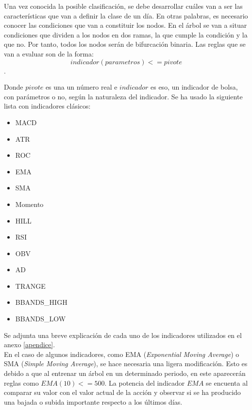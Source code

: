 Una vez conocida la posible clasificaci\'on, se debe desarrollar cu\'ales van a ser las caracter\'isticas que van a definir la clase de un d\'ia. En otras palabras, es necesario conocer las condiciones que van a constituir los nodos. En el \'arbol se van a situar condiciones que dividen a los nodos en dos ramas, la que cumple la condici\'on y la que no. Por tanto, todos los nodos ser\'an de bifurcaci\'on binaria. Las reglas que se van a evaluar son de la forma: 
 \[indicador(parametros) <= pivote\].
 
 Donde $pivote$ es una un n\'umero real e $indicador$ es eso, un indicador de bolsa, con par\'ametros o no, seg\'un la naturaleza del indicador. Se ha usado la siguiente lista con indicadores cl\'asicos:
 
 \begin{itemize}
     \item MACD
     \item ATR
     \item ROC
     \item EMA
     \item SMA
     \item Momento
     \item HILL
     \item RSI
     \item OBV
     \item AD
     \item TRANGE
     \item BBANDS\_HIGH
     \item BBANDS\_LOW
 \end{itemize}
 
Se adjunta una breve explicaci\'on de cada uno de los indicadores utilizados en el anexo \ref{apendice}.\\ 
 
 En el caso de algunos indicadores, como EMA (\textit{Exponential Moving Average}) o SMA (\textit{Simple Moving Average}), se hace necesaria una ligera modificaci\'on. Esto es debido a que al entrenar un \'arbol en un determinado periodo, en este aparecer\'an reglas como $EMA(10) <= 500$. La potencia del indicador $EMA$ se encuenta al comparar su valor con el valor actual de la acci\'on y observar si se ha producido una bajada o subida importante respecto a los \'ultimos d\'ias.  

